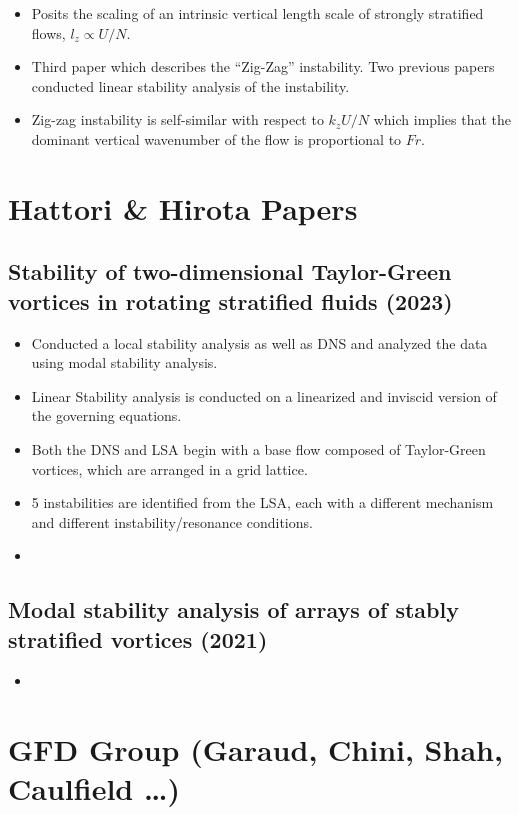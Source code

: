 \documentclass{article}
\begin{document}
\begin{itemize}
    \item Posits the scaling of an intrinsic vertical length scale of strongly
    stratified flows, $l_z \propto U/N$. 
    \item Third paper which describes the ``Zig-Zag'' instability. Two previous
    papers conducted linear stability analysis of the instability. 
    \item Zig-zag instability is self-similar with respect to $k_zU/N$ which
    implies that the dominant vertical wavenumber of the flow is proportional to
    $Fr$. 
\end{itemize}


\section{Hattori \& Hirota Papers}

\subsection{Stability of two-dimensional Taylor-Green vortices in rotating
stratified fluids (2023)}
\begin{itemize}
    \item Conducted a local stability analysis as well as DNS and analyzed the
    data using modal stability analysis. 
    \item Linear Stability analysis is conducted on a linearized and inviscid
    version of the governing equations.
    \item Both the DNS and LSA begin with a base flow composed of Taylor-Green
    vortices, which are arranged in a grid lattice. 
    \item 5 instabilities are identified from the LSA, each with a different
    mechanism and different instability/resonance conditions. 
    \item 
\end{itemize}

\subsection{Modal stability analysis of arrays of stably stratified vortices
(2021)}
\begin{itemize}
    \item 
\end{itemize}

\section{GFD Group (Garaud, Chini, Shah, Caulfield \ldots)}
\end{document}
